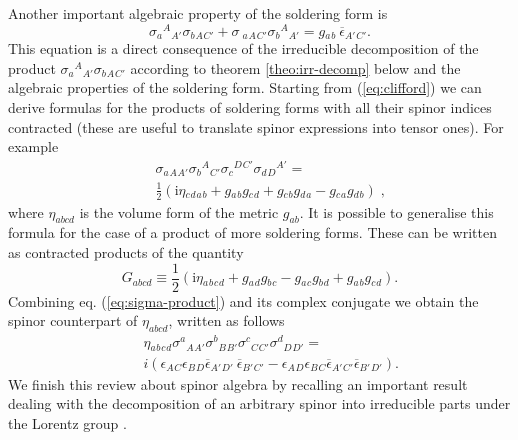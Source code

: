 \documentclass[final,3p,times,twocolumn]{elsarticle}
\begin{document}
Another important algebraic property of the soldering form is
\begin{equation}
\sigma {}_{a}{}^{A}{}_{A'} \sigma {}_{b}{}_{A}{}_{C'} + \sigma \
{}_{a}{}_{A}{}_{C'} \sigma {}_{b}{}^{A}{}_{A'} =  g{}_{a}{}_{b} \
\overline{\epsilon }{}_{A'}{}_{C'}.
\label{eq:clifford}
\end{equation}
This equation is a direct consequence of the irreducible decomposition of the product 
$\sigma{}_{a}{}^{A}{}_{A'}\sigma {}_{b}{}_{A}{}_{C'}$ according to theorem
\ref{theo:irr-decomp} below and the algebraic properties of the soldering form.
Starting from (\ref{eq:clifford}) we can derive formulas for the products of soldering forms 
with all their spinor indices contracted 
(these are useful to translate spinor expressions into tensor ones). For example
\begin{eqnarray}
&&\sigma {}_{a}{}_{A}{}_{A'} \sigma {}_{b}{}^{A}{}_{C'} 
\sigma{}_{c}{}^{D}{}^{C'} \sigma {}_{d}{}_{D}{}^{A'}=\nonumber\\
&&\frac{1}{2}(\mbox{i}\eta{}_{c}{}_{d}{}_{a}{}_{b} + g{}_{a}{}_{b} g{}_{c}{}_{d} + g{}_{c}{}_{b} g{}_{d}{}_{a}- g{}_{c}{}_{a} g{}_{d}{}_{b})\;,
\label{eq:sigma-product}
\end{eqnarray}
where $\eta_{abcd}$ is the volume form of the metric $g_{ab}$. 
It is possible to generalise this formula for the case  of a product of more soldering forms. These can be written as contracted products of the quantity
\begin{equation}
G_{abcd}\equiv \frac{1}{2}
(\mbox{i}\eta{}_{a}{}_{b}{}_{c}{}_{d} + g{}_{a}{}_{d} g{}_{b}{}_{c} 
- g{}_{a}{}_{c} g{}_{b}{}_{d}+ g{}_{a}{}_{b} g{}_{c}{}_{d}).
\label{eq:tetra-g}
\end{equation}
Combining eq. (\ref{eq:sigma-product}) and its complex conjugate we obtain the spinor counterpart of $\eta_{abcd}$, written as follows
\begin{eqnarray}
&& \eta{}_{a}{}_{b}{}_{c}{}_{d} \sigma {}^{a}{}_{A}{}_{A'} 
\sigma{}^{b}{}_{B}{}_{B'} \sigma {}^{c}{}_{C}{}_{C'}\sigma{}^{d}{}_{D}{}_{D'} =\nonumber\\
&&i (\epsilon {}_{A}{}_{C}\epsilon{}_{B}{}_{D} \overline{\epsilon }{}_{A'}{}_{D'} \
\overline{\epsilon }{}_{B'}{}_{C'} -\epsilon{}_{A}{}_{D}\epsilon{}_{B}{}_{C} \overline{\epsilon }{}_{A'}{}_{C'}
\overline{\epsilon }{}_{B'}{}_{D'}). 
\end{eqnarray}
We finish this review about spinor algebra by recalling an important result dealing with the 
decomposition of an arbitrary spinor into irreducible parts 
under the Lorentz group \cite{PR-RINDLER-1}. 
\end{document}
